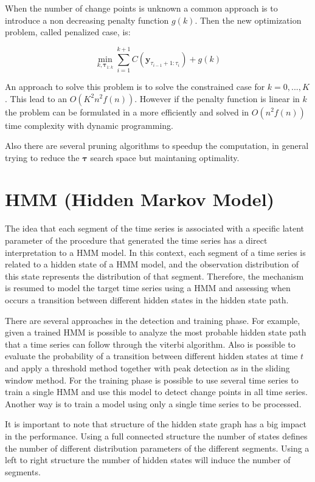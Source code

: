 When the number of change points is unknown a common approach is to introduce a non decreasing penalty function $g(k)$. Then the new optimization problem, called penalized case, is:

\begin{equation}
    \min_{k, \boldsymbol \tau_{1 : k}} \sum \limits_{i = 1}^{k + 1} C(\mathbf{y}_{\tau_{i - 1} + 1 : \tau_{i}}) + g(k)
\end{equation}

An approach to solve this problem is to solve the constrained case for $k = 0, ..., K$. This lead to an $O(K^{2} n^{2} f(n))$. However if the penalty function is linear in $k$ the problem can be formulated in a more efficiently and solved in $O(n^{2} f(n))$ time complexity with dynamic programming.

Also there are several pruning algorithms to speedup the computation, in general trying to reduce the $\boldsymbol \tau$ search space but maintaning optimality.

\section{HMM (Hidden Markov Model)}

The idea that each segment of the time series is associated with a specific latent parameter of the procedure that generated the time series has a direct interpretation to a HMM model. In this context, each segment of a time series is related to a hidden state of a HMM model, and the observation distribution of this state represents the distribution of that segment. Therefore, the mechanism is resumed to model the target time series using a HMM and assessing when occurs a transition between different hidden states in the hidden state path.

There are several approaches in the detection and training phase. For example, given a trained HMM is possible to analyze the most probable hidden state path that a time series can follow through the viterbi algorithm. Also is possible to evaluate the probability of a transition between different hidden states at time $t$ and apply a threshold method together with peak detection as in the sliding window method. For the training phase is possible to use several time series to train a single HMM and use this model to detect change points in all time series. Another way is to train a model using only a single time series to be processed.

It is important to note that structure of the hidden state graph has a big impact in the performance. Using a full connected structure the number of states defines the number of different distribution parameters of the different segments. Using a left to right structure the number of hidden states will induce the number of segments.

